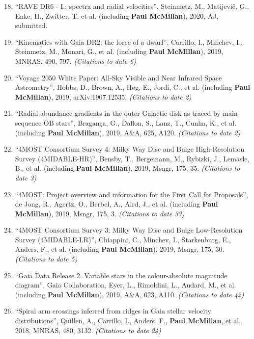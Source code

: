 \documentclass{resume}
\begin{document}
\begin{enumerate}
\setcounter{enumi}{17}
\item ``RAVE DR6 - I.: spectra and radial velocities'', Steinmetz, M., Matijevi\v c, G., Enke, H., Zwitter, T. et al. (including \textbf{Paul McMillan}), 2020, AJ, submitted.
\item ``Kinematics with Gaia DR2: the force of a dwarf'', Carrillo, I., Minchev, I., Steinmetz, M., Monari, G., et al. (including \textbf{Paul McMillan}), 2019, MNRAS, 490, 797. \textit{(Citations to date 6)}

\item ``Voyage 2050 White Paper: All-Sky Visible and Near Infrared Space Astrometry'', Hobbs, D., Brown, A., H{\o}g, E., Jordi, C., et al. (including \textbf{Paul McMillan}), 2019, arXiv:1907.12535. \textit{(Citations to date 2)}

\item ``Radial abundance gradients in the outer Galactic disk as traced by main-sequence OB stars'', Bragan\c{c}a, G., Daflon, S., Lanz, T., Cunha, K., et al. (including \textbf{Paul McMillan}), 2019, A\&A, 625, A120. \textit{(Citations to date 2)}

\item ``4MOST Consortium Survey 4: Milky Way Disc and Bulge High-Resolution Survey (4MIDABLE-HR)'', Bensby, T., Bergemann, M., Rybizki, J., Lemasle, B., et al. (including \textbf{Paul McMillan}), 2019, Msngr, 175, 35. \textit{(Citations to date 3)}

\item ``4MOST: Project overview and information for the First Call for Proposals'', de Jong, R., Agertz, O., Berbel, A., Aird, J., et al. (including \textbf{Paul McMillan}), 2019, Msngr, 175, 3. \textit{(Citations to date 33)}

\item ``4MOST Consortium Survey 3: Milky Way Disc and Bulge Low-Resolution Survey (4MIDABLE-LR)'', Chiappini, C., Minchev, I., Starkenburg, E., Anders, F., et al. (including \textbf{Paul McMillan}), 2019, Msngr, 175, 30. \textit{(Citations to date 5)}

\item ``Gaia Data Release 2. Variable stars in the colour-absolute magnitude diagram'', Gaia Collaboration, Eyer, L., Rimoldini, L., Audard, M., et al. (including \textbf{Paul McMillan}), 2019, A\&A, 623, A110. \textit{(Citations to date 42)}

\item ``Spiral arm crossings inferred from ridges in Gaia stellar velocity distributions'', Quillen, A., Carrillo, I., Anders, F., \textbf{Paul McMillan}, et al., 2018, MNRAS, 480, 3132. \textit{(Citations to date 24)}


\end{enumerate}
\end{document}
